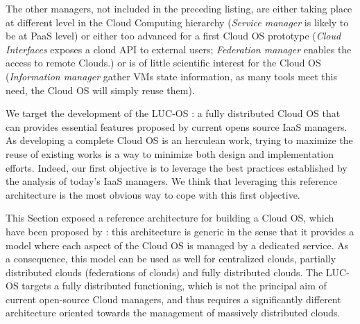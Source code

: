 The other managers, not included in the preceding listing, are either taking 
place at different level in the Cloud Computing hierarchy (\emph{Service 
manager} is likely to be at PaaS level) or either too advanced for a first Cloud
OS prototype (\emph{Cloud Interfaces} exposes a cloud API to external users; 
\emph{Federation manager} enables the access to remote Clouds.) or is of little 
scientific interest for the Cloud OS (\emph{Information manager} gather VMs 
state information, as many tools meet this need, the Cloud OS will simply 
reuse them).

We target the development of the LUC-OS : a fully distributed Cloud OS that can 
provides essential features proposed by current opens source IaaS managers. As
developing a complete Cloud OS is an herculean work, trying to maximize the 
reuse of existing works is a way to minimize both design and implementation 
efforts. Indeed, our first objective is to leverage the best practices 
established by the analysis of today's IaaS managers. We think that leveraging
this reference architecture is the most obvious way to cope with this first
objective.

This Section exposed a reference architecture for building a Cloud OS, which 
have been proposed by \cite{moreno2012iaas}: this architecture is generic in the
sense that it provides a model where each aspect of the Cloud OS is managed by a
dedicated service. As a consequence, this model can be used as well for 
centralized clouds, partially distributed clouds (federations of clouds) and 
fully distributed clouds. The LUC-OS targets a fully distributed functioning, 
which is not the principal aim of current open-source Cloud managers, and thus
requires a significantly different architecture oriented towards the management 
of massively distributed clouds.
